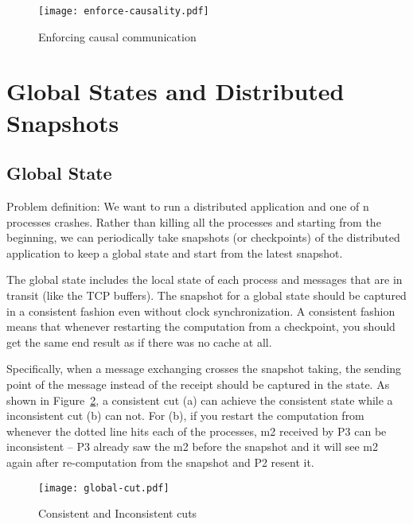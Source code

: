 \documentclass[twoside]{article}
\begin{document}
\begin{figure}[H]
    \centering
    \texttt{[image: enforce-causality.pdf]}
    \caption{Enforcing causal communication}
    \label{fig:enforce-causal}
\end{figure}

\section{Global States and Distributed Snapshots}

\subsection{Global State}
 
Problem definition: We want to run a distributed application and one of n processes crashes. Rather than killing all the processes and starting from the beginning, we can periodically take snapshots (or checkpoints) of the distributed application to keep a global state and start from the latest snapshot.

The global state includes the local state of each process and messages that are in transit (like the TCP buffers). The snapshot for a global state should be captured in a consistent fashion even without clock synchronization. 
A consistent fashion means that whenever restarting the computation from a checkpoint, you should get the same end result as if there was no cache at all. 

Specifically, when a message exchanging crosses the snapshot taking, the sending point of the message instead of the receipt should be captured in the state. As shown in Figure~\ref{fig:global-cut}, a consistent cut (a) can achieve the consistent state while a inconsistent cut (b) can not. For (b), if you restart the computation from whenever the dotted line hits each of the processes, m2 received by P3 can be inconsistent -- P3 already saw the m2 before the snapshot and it will see m2 again after re-computation from the snapshot and P2 resent it.


\begin{figure}[H]
    \centering
    \texttt{[image: global-cut.pdf]}
    \caption{Consistent and Inconsistent cuts}
    \label{fig:global-cut}
\end{figure}
\end{document}
